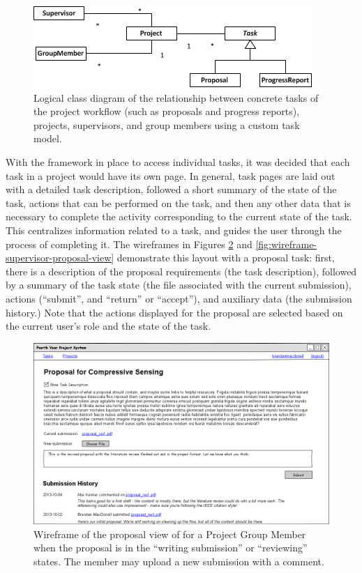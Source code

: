 \begin{figure}[!htbp]
\centering \includegraphics{./img/case-study-fourth-year-system/task-through-project-static-structure}
\caption{Logical class diagram of the relationship between concrete tasks of the project workflow (such as proposals and progress reports), projects, supervisors, and group members using a custom task model.}
\label{fig:custom-task-simplicity}
\end{figure}

With the framework in place to access individual tasks, it was decided that each task in a project would have its own page. In general, task pages are laid out with a detailed task description, followed a short summary of the state of the task, actions that can be performed on the task, and then any other data that is necessary to complete the activity corresponding to the current state of the task. This centralizes information related to a task, and guides the user through the process of completing it. The wireframes in Figures \ref{fig:wireframe-group-member-proposal-view} and \ref{fig:wireframe-supervisor-proposal-view} demonstrate this layout with a proposal task: first, there is a description of the proposal requirements (the task description), followed by a summary of the task state (the file associated with the current submission), actions (``submit'', and ``return'' or ``accept''), and auxiliary data (the submission history.) Note that the actions displayed for the proposal are selected based on the current user's role and the state of the task.

\begin{figure}[!htbp]
\centering \includegraphics[width=6in]{./img/case-study-fourth-year-system/group-member-proposal-view_wireframe}
\caption{Wireframe of the proposal view of for a Project Group Member when the proposal is in the ``writing submission'' or ``reviewing'' states. The member may upload a new submission with a comment.}
\label{fig:wireframe-group-member-proposal-view}
\end{figure}

